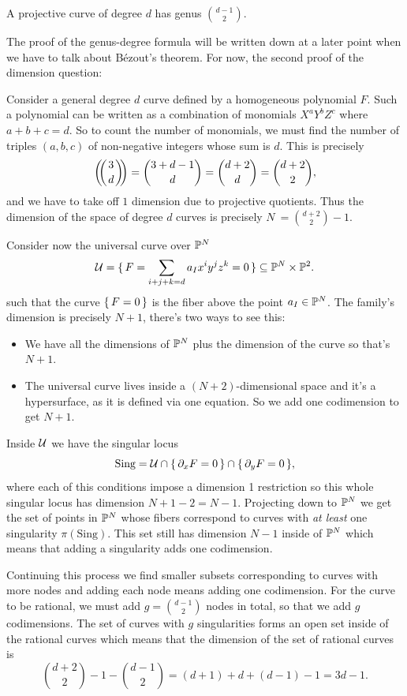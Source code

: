 \documentclass[12pt]{memoir}
\begin{document}
\begin{Prop}\label{prop-genus-degree-formula}
    A projective curve of degree $d$ has genus $\binom{d-1}{2}$.
\end{Prop}

The proof of the genus-degree formula will be written down at a later point when we have to talk about Bézout's theorem. For now, the second proof of the dimension question:

\begin{ptcbp}
    Consider a general degree $d$ curve defined by a homogeneous polynomial $F$. Such a polynomial can be written as a combination of monomials $X^{a}Y^{b}Z^{c}$ where $a+b+c=d$. So to count the number of monomials, we must find the number of triples $(a,b,c)$ of non-negative integers whose sum is $d$. This is precisely 
    $$\multinom{3}{d}=\binom{3+d-1}{d}=\binom{d+2}{d}=\binom{d+2}{2},$$
    and we have to take off $1$ dimension due to projective quotients. Thus the dimension of the space of degree $d$ curves is precisely $N\:=\binom{d+2}{2}-1$.\par 
    Consider now the universal curve over $\mathbb{P}^N$
    $$\mathcal{U}=\{\,F=\sum_{i+j+k=d}a_Ix^iy^jz^k=0\,\}\subseteq\mathbb{P}^N\times\mathbb{P}^2.$$
    such that the curve $\{\,F=0\,\}$ is the fiber above the point $a_I\in\mathbb{P}^N$. The family's dimension is precisely $N+1$, there's two ways to see this:
    \begin{itemize}
        \item We have all the dimensions of $\mathbb{P}^N$ plus the dimension of the curve so that's $N+1$.
        \item The universal curve lives inside a $(N+2)$-dimensional space and it's a hypersurface, as it is defined via one equation. So we add one codimension to get $N+1$.
    \end{itemize}
    Inside $\mathcal{U}$ we have the singular locus
    $$\text{Sing}=\mathcal{U}\cap\{\,\partial_xF=0\,\}\cap\{\,\partial_yF=0\,\},$$
    where each of this conditions impose a dimension 1 restriction so this whole singular locus has dimension $N+1-2=N-1$. Projecting down to $\mathbb{P}^N$ we get the set of points in $\mathbb{P}^N$ whose fibers correspond to curves with \emph{at least} one singularity $\pi(\text{Sing})$. This set still has dimension $N-1$ inside of $\mathbb{P}^N$ which means that adding a singularity adds one codimension.\par 
    Continuing this process we find smaller subsets corresponding to curves with more nodes and adding each node means adding one codimension. For the curve to be rational, we must add $g=\binom{d-1}{2}$ nodes in total, so that we add $g$ codimensions. The set of curves with $g$ singularities forms an open set inside of the rational curves which means that the dimension of the set of rational curves is
    $$\binom{d+2}{2}-1-\binom{d-1}{2}=(d+1)+d+(d-1)-1=3d-1.$$
\end{ptcbp}
\end{document}
